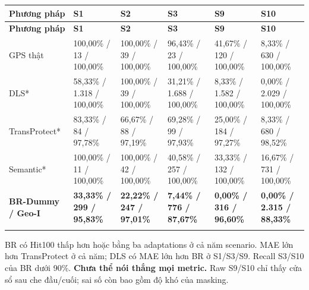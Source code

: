 \documentclass[11pt,a4paper]{article}
\begin{document}
\begingroup\small
\begin{longtable}{@{}P{3.489cm}P{2.492cm}P{2.492cm}P{2.492cm}P{2.492cm}P{2.492cm}@{}}
\toprule
\textbf{Phương pháp} & \textbf{S1} & \textbf{S2} & \textbf{S3} & \textbf{S9} & \textbf{S10}\\\midrule
\endfirsthead
\toprule
\textbf{Phương pháp} & \textbf{S1} & \textbf{S2} & \textbf{S3} & \textbf{S9} & \textbf{S10}\\\midrule
\endhead\bottomrule\endfoot
GPS thật & 100,00\% / 13 / 100,00\% & 100,00\% / 39 / 100,00\% & 96,43\% / 23 / 100,00\% & 41,67\% / 120 / 100,00\% & 8,33\% / 630 / 100,00\%\\
\addlinespace[2pt]
DLS* & 58,33\% / 1.318 / 100,00\% & 100,00\% / 39 / 100,00\% & 31,21\% / 1.688 / 100,00\% & 8,33\% / 1.582 / 100,00\% & 0,00\% / 2.029 / 100,00\%\\
\addlinespace[2pt]
TransProtect* & 83,33\% / 84 / 97,78\% & 66,67\% / 88 / 97,19\% & 69,28\% / 99 / 97,93\% & 25,00\% / 184 / 97,27\% & 8,33\% / 680 / 98,52\%\\
\addlinespace[2pt]
Semantic* & 100,00\% / 11 / 100,00\% & 100,00\% / 42 / 100,00\% & 40,58\% / 257 / 100,00\% & 33,33\% / 132 / 100,00\% & 16,67\% / 731 / 100,00\%\\
\addlinespace[2pt]
\textbf{BR-Dummy / Geo-I} & \textbf{33,33\% / 299 / 95,83\%} & \textbf{22,22\% / 247 / 97,01\%} & \textbf{7,44\% / 776 / 87,67\%} & \textbf{0,00\% / 316 / 96,60\%} & \textbf{0,00\% / 2.315 / 88,33\%}\\
\addlinespace[2pt]
\end{longtable}
\endgroup
BR có Hit100 thấp hơn hoặc bằng ba adaptations ở cả năm scenario. MAE lớn hơn TransProtect ở cả năm; DLS có MAE lớn hơn BR ở S1/S3/S9. Recall S3/S10 của BR dưới 90\%. \textbf{Chưa thể nói thắng mọi metric.} Raw S9/S10 chỉ thấy cửa sổ sau che đầu/cuối; sai số còn bao gồm độ khó của masking.
\end{document}
